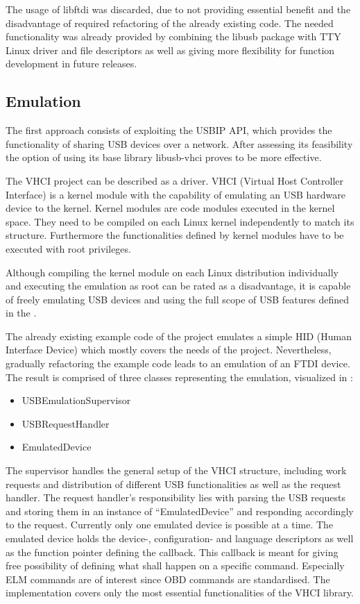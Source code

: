 The usage of libftdi was discarded, due to not providing essential benefit and the disadvantage of required refactoring of the already existing 
code. The needed functionality was already provided by combining the libusb package with TTY Linux driver and file descriptors as well as giving more
flexibility for function development in future releases.

\subsection{Emulation}
\label{sec:emulation}
The first approach consists of exploiting the USBIP API, which provides the functionality of sharing USB devices over a network. After 
assessing its feasibility the option of using its base library libusb-vhci proves to be more effective.

The VHCI project can be described as a driver. VHCI \cite{VHCI} (Virtual Host Controller Interface) is a kernel module with the capability of emulating an 
USB hardware device to the kernel. Kernel modules are code modules executed in the kernel space. They need to be compiled on each Linux kernel 
independently to match its structure. Furthermore the functionalities defined by kernel modules have to be executed with root privileges.

Although compiling the kernel module on each Linux distribution individually and executing the emulation as root can be rated as a disadvantage,
it is capable of freely emulating USB devices and using the full scope of USB features defined in the  \cite{USB}. 

The already existing example code of the project emulates a simple HID (Human Interface Device) which mostly covers the needs of the project. 
Nevertheless, gradually refactoring the example code leads to an emulation of an FTDI device. The result is comprised of three classes 
representing the emulation, visualized in :

\begin{itemize}
 \item USBEmulationSupervisor
 \item USBRequestHandler
 \item EmulatedDevice
\end{itemize}

The supervisor handles the general setup of the VHCI structure, including work requests and distribution of different USB functionalities as 
well as the request handler. The request handler’s responsibility lies with parsing the USB requests and storing them in an instance of 
“EmulatedDevice” and responding accordingly to the request. Currently only one emulated device is possible at a time. The emulated device holds 
the device-, configuration- and language descriptors as well as the function pointer defining the callback. This callback is meant for giving 
free possibility of defining what shall happen on a specific command. Especially ELM commands are of interest since OBD commands are 
standardised. The implementation covers only the most essential functionalities of the VHCI library.

